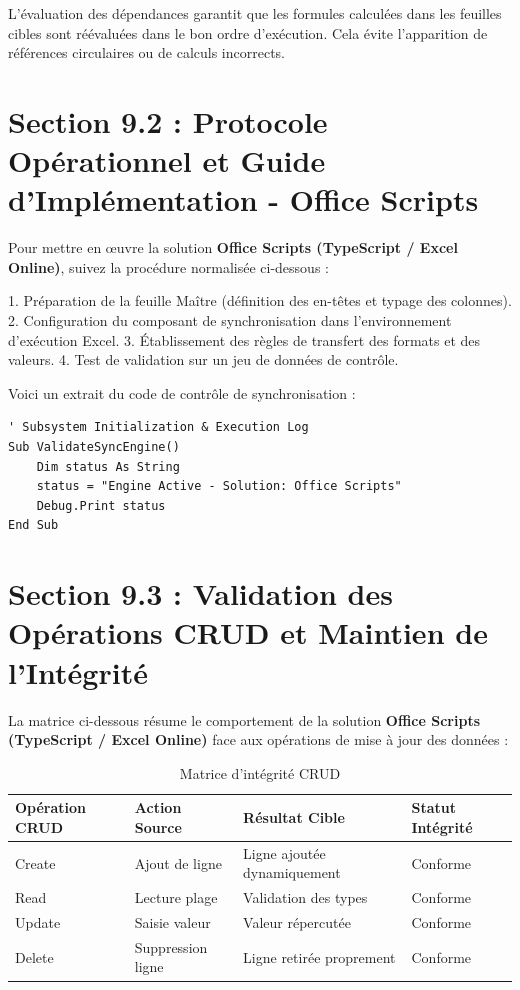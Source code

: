 \documentclass[12pt,a4paper]{report}
\begin{document}
L'évaluation des dépendances garantit que les formules calculées dans les feuilles cibles sont réévaluées dans le bon ordre d'exécution. Cela évite l'apparition de références circulaires ou de calculs incorrects.


\section{Section 9.2 : Protocole Opérationnel et Guide d'Implémentation - Office Scripts}
Pour mettre en œuvre la solution \textbf{Office Scripts (TypeScript / Excel Online)}, suivez la procédure normalisée ci-dessous :

1. Préparation de la feuille Maître (définition des en-têtes et typage des colonnes).
2. Configuration du composant de synchronisation dans l'environnement d'exécution Excel.
3. Établissement des règles de transfert des formats et des valeurs.
4. Test de validation sur un jeu de données de contrôle.

Voici un extrait du code de contrôle de synchronisation :
\begin{lstlisting}[caption=Code de controle operationnel]
' Subsystem Initialization & Execution Log
Sub ValidateSyncEngine()
    Dim status As String
    status = "Engine Active - Solution: Office Scripts"
    Debug.Print status
End Sub
\end{lstlisting}


\section{Section 9.3 : Validation des Opérations CRUD et Maintien de l'Intégrité}
La matrice ci-dessous résume le comportement de la solution \textbf{Office Scripts (TypeScript / Excel Online)} face aux opérations de mise à jour des données :

\begin{table}[h]
\centering
\begin{tabular}{@{}llll@{}}
\toprule
\textbf{Opération CRUD} & \textbf{Action Source} & \textbf{Résultat Cible} & \textbf{Statut Intégrité} \\ \midrule
Create & Ajout de ligne & Ligne ajoutée dynamiquement & Conforme \\
Read & Lecture plage & Validation des types & Conforme \\
Update & Saisie valeur & Valeur répercutée & Conforme \\
Delete & Suppression ligne & Ligne retirée proprement & Conforme \\ \bottomrule
\end{tabular}
\caption{Matrice d'intégrité CRUD}
\end{table}
\end{document}
